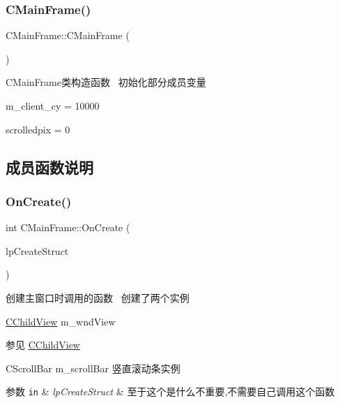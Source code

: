 \subsubsection{\texorpdfstring{C\+Main\+Frame()}{CMainFrame()}}
{\footnotesize\ttfamily C\+Main\+Frame\+::\+C\+Main\+Frame (\begin{DoxyParamCaption}{ }\end{DoxyParamCaption})}



C\+Main\+Frame类构造函数~\newline
初始化部分成员变量 


\begin{DoxyItemize}
\item m\+\_\+client\+\_\+cy = 10000
\item scrolledpix = 0 
\end{DoxyItemize}

\subsection{成员函数说明}
\mbox{\label{class_c_main_frame_a48666466fd37412fcaeff75c3b12e0ed}} 
\subsubsection{\texorpdfstring{On\+Create()}{OnCreate()}}
{\footnotesize\ttfamily int C\+Main\+Frame\+::\+On\+Create (\begin{DoxyParamCaption}\item[{L\+P\+C\+R\+E\+A\+T\+E\+S\+T\+R\+U\+CT}]{lp\+Create\+Struct }\end{DoxyParamCaption})\hspace{0.3cm}{\ttfamily [protected]}}



创建主窗口时调用的函数~\newline
创建了两个实例~\newline



\begin{DoxyItemize}
\item \hyperlink{class_c_child_view}{C\+Child\+View} m\+\_\+wnd\+View \begin{DoxySeeAlso}{参见}
\hyperlink{class_c_child_view}{C\+Child\+View}
\end{DoxySeeAlso}

\item C\+Scroll\+Bar m\+\_\+scroll\+Bar 竖直滚动条实例 
\begin{DoxyParams}[1]{参数}
\mbox{\tt in}  & {\em lp\+Create\+Struct} & 至于这个是什么不重要,不需要自己调用这个函数 \\
\hline
\end{DoxyParams}

\end{DoxyItemize}\mbox{\label{class_c_main_frame_adf171bf1f2c6f10cc85dbe8db3fc93f7}} 
